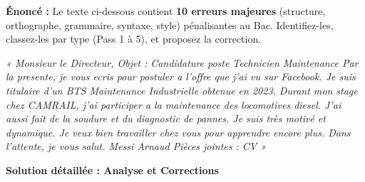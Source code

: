 \documentclass[11pt]{article}
\begin{document}
\begin{exoresolu}
\textbf{Énoncé :} Le texte ci-dessous contient \textbf{10 erreurs majeures} (structure, orthographe, grammaire, syntaxe, style) pénalisantes au Bac. Identifiez-les, classez-les par type (Pass 1 à 5), et proposez la correction.

\textit{« Monsieur le Directeur,
Objet : Candidature poste Technicien Maintenance
Par la presente, je vous ecris pour postuler a l'offre que j'ai vu sur Facebook. Je suis titulaire d'un BTS Maintenance Industrielle obtenue en 2023. Durant mon stage chez CAMRAIL, j'ai participer a la maintenance des locomotives diesel. J'ai aussi fait de la soudure et du diagnostic de pannes. Je suis très motivé et dynamique. Je veux bien travailler chez vous pour apprendre encore plus.
Dans l'attente, je vous salut.
Messi Arnaud
Pièces jointes : CV »}

\tcblower
\textbf{Solution détaillée : Analyse et Corrections}


\end{exoresolu}
\end{document}
